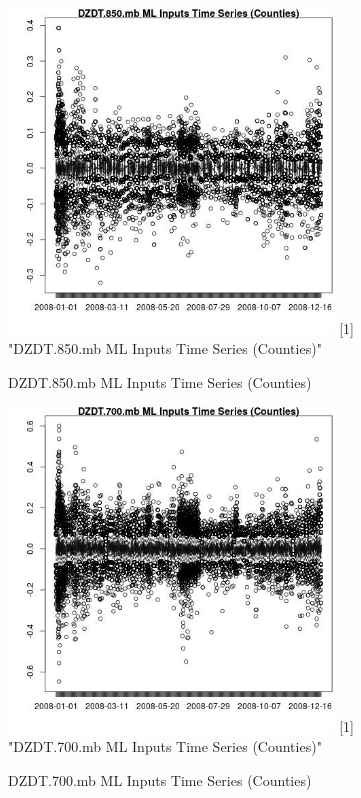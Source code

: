 \begin{figure} 
\centering  
\includegraphics[width=0.77\textwidth]{Code_Outputs/ML_input_report_ML_input_CountyGeometricCentroids_Locations_Dates_part_c_2008-01-01to2008-12-31_DZDT.850.mbTS.jpg} 
[1] "DZDT.850.mb ML Inputs Time Series (Counties)"
\caption{\label{fig:ML_input_report_ML_input_CountyGeometricCentroids_Locations_Dates_part_c_2008-01-01to2008-12-31DZDT.850.mbTS}DZDT.850.mb ML Inputs Time Series (Counties)} 
\end{figure} 
 

\begin{figure} 
\centering  
\includegraphics[width=0.77\textwidth]{Code_Outputs/ML_input_report_ML_input_CountyGeometricCentroids_Locations_Dates_part_c_2008-01-01to2008-12-31_DZDT.700.mbTS.jpg} 
[1] "DZDT.700.mb ML Inputs Time Series (Counties)"
\caption{\label{fig:ML_input_report_ML_input_CountyGeometricCentroids_Locations_Dates_part_c_2008-01-01to2008-12-31DZDT.700.mbTS}DZDT.700.mb ML Inputs Time Series (Counties)} 
\end{figure} 
 

